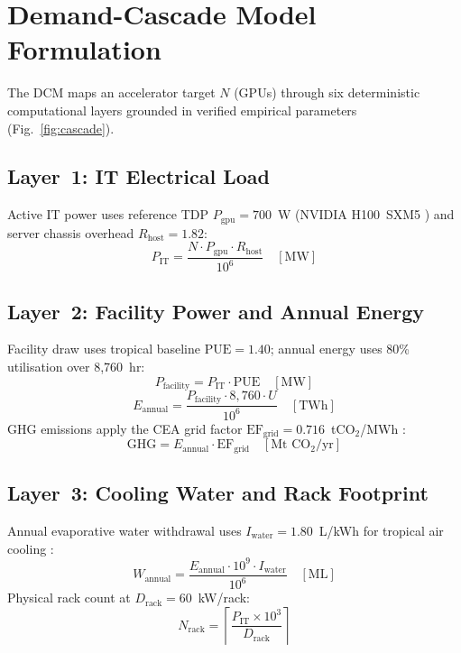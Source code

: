 \documentclass[conference]{IEEEtran}
\begin{document}
\section{Demand-Cascade Model Formulation}

The DCM maps an accelerator target $N$ (GPUs) through six deterministic computational layers grounded in verified empirical parameters (Fig.~\ref{fig:cascade}).

\subsection{Layer~1: IT Electrical Load}

Active IT power uses reference TDP $P_{\text{gpu}} = 700$~W (NVIDIA H100~SXM5 \cite{nvidia2024h100}) and server chassis overhead $R_{\text{host}} = 1.82$:
\begin{equation}
  P_{\text{IT}} = \frac{N \cdot P_{\text{gpu}} \cdot R_{\text{host}}}{10^{6}} \quad [\text{MW}]
  \label{eq:it_load}
\end{equation}

\subsection{Layer~2: Facility Power and Annual Energy}

Facility draw uses tropical baseline $\text{PUE} = 1.40$; annual energy uses 80\% utilisation over 8{,}760~hr:
\begin{equation}
  P_{\text{facility}} = P_{\text{IT}} \cdot \text{PUE} \quad [\text{MW}]
  \label{eq:facility}
\end{equation}
\begin{equation}
  E_{\text{annual}} = \frac{P_{\text{facility}} \cdot 8{,}760 \cdot U}{10^{6}} \quad [\text{TWh}]
  \label{eq:energy}
\end{equation}
GHG emissions apply the CEA grid factor $\text{EF}_{\text{grid}} = 0.716$~tCO$_2$/MWh \cite{cea2026transmission}:
\begin{equation}
  \text{GHG} = E_{\text{annual}} \cdot \text{EF}_{\text{grid}} \quad [\text{Mt CO}_2/\text{yr}]
  \label{eq:ghg}
\end{equation}

\subsection{Layer~3: Cooling Water and Rack Footprint}

Annual evaporative water withdrawal uses $I_{\text{water}} = 1.80$~L/kWh for tropical air cooling \cite{iea2024aienergy}:
\begin{equation}
  W_{\text{annual}} = \frac{E_{\text{annual}} \cdot 10^{9} \cdot I_{\text{water}}}{10^{6}} \quad [\text{ML}]
  \label{eq:water}
\end{equation}
Physical rack count at $D_{\text{rack}} = 60$~kW/rack:
\begin{equation}
  N_{\text{rack}} = \left\lceil \frac{P_{\text{IT}} \times 10^{3}}{D_{\text{rack}}} \right\rceil
  \label{eq:racks}
\end{equation}
\end{document}
